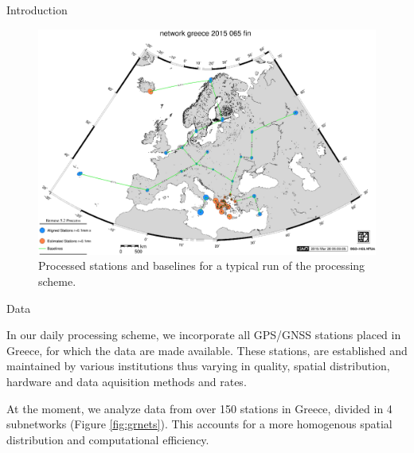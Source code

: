 \documentclass[final,a0,portrait]{beamer}
\newlength{\onecolwid}
\begin{document}
\begin{frame}[t]
\begin{columns}[t]
\begin{column}{\onecolwid}
\begin{block}{Introduction}
{}
\end{block}


\begin{figure}
    \includegraphics[width=0.7\onecolwid]{eu-greece-15065-fin-proc.eps}
    \caption{Processed stations and baselines for a typical run of the processing scheme.}
    \label{fig:proc-net}
\end{figure}
\begin{block}{Data}
{\small
In our daily processing scheme, we incorporate all GPS/GNSS stations placed in Greece, for which the data are made available. 
These stations, are established and maintained by various institutions thus varying in quality, spatial distribution, hardware and 
data aquisition methods and rates.

At the moment, we analyze data from over 150 stations in Greece, divided in 4 subnetworks (Figure \ref{fig:grnets}). 
This accounts for a more homogenous spatial distribution and computational efficiency.


}
\end{block}
\end{column}
\end{columns}
\end{frame}
\end{document}
